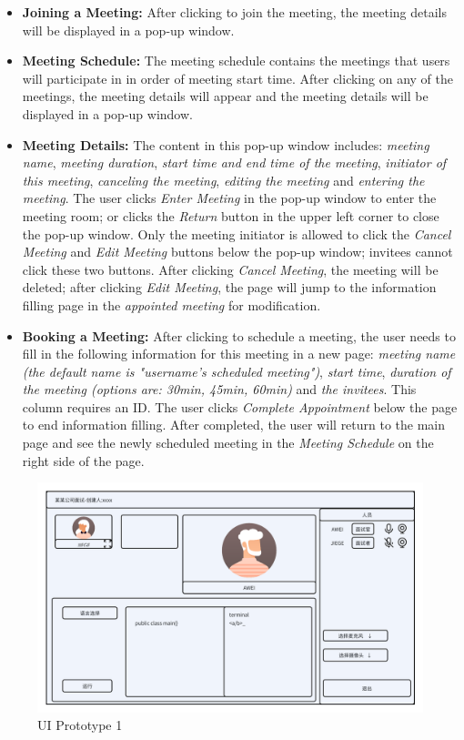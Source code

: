 \documentclass{article}
\begin{document}
\begin{itemize}
  \item \textbf{Joining a Meeting:} After clicking to join the meeting, the meeting details will be displayed in a pop-up window.
  \item \textbf{Meeting Schedule:} The meeting schedule contains the meetings that users will participate in in order of meeting start time. After clicking on any of the meetings, the meeting details will appear and the meeting details will be displayed in a pop-up window.
  \item \textbf{Meeting Details:} The content in this pop-up window includes: \textit{meeting name}, \textit{meeting duration}, \textit{start time and end time of the meeting}, \textit{initiator of this meeting}, \textit{canceling the meeting}, \textit{editing the meeting} and \textit{entering the meeting}. The user clicks \textit{Enter Meeting} in the pop-up window to enter the meeting room; or clicks the \textit{Return} button in the upper left corner to close the pop-up window. Only the meeting initiator is allowed to click the \textit{Cancel Meeting} and \textit{Edit Meeting} buttons below the pop-up window; invitees cannot click these two buttons. After clicking \textit{Cancel Meeting}, the meeting will be deleted; after clicking \textit{Edit Meeting}, the page will jump to the information filling page in the \textit{appointed meeting} for modification.
  \item \textbf{Booking a Meeting:} After clicking to schedule a meeting, the user needs to fill in the following information for this meeting in a new page: \textit{meeting name (the default name is "username's scheduled meeting")}, \textit{start time}, \textit{duration of the meeting (options are: 30min, 45min, 60min)} and \textit{the invitees}. This column requires an ID. The user clicks \textit{Complete Appointment} below the page to end information filling. After completed, the user will return to the main page and see the newly scheduled meeting in the \textit{Meeting Schedule} on the right side of the page.
\end{itemize}

\begin{figure}[H]
  \center
  \includegraphics[scale=0.18]{diagrams/ui-prototype-1.png}
  \caption{UI Prototype 1}
\end{figure}
\end{document}
